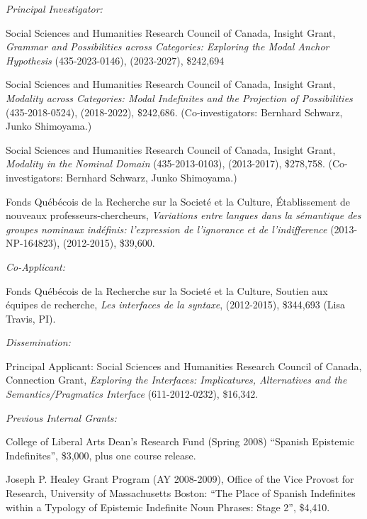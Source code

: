 \documentclass[11pt]{article}
\begin{document}
\textit{Principal Investigator:}

 Social Sciences and Humanities Research
Council of Canada, Insight Grant, \textit{Grammar and Possibilities across Categories: Exploring
the Modal Anchor Hypothesis} (435-2023-0146), (2023-2027), \$242,694

 Social Sciences and Humanities Research
Council of Canada, Insight Grant, \textit{Modality across Categories: Modal Indefinites and the Projection of Possibilities} (435-2018-0524), (2018-2022), \$242,686. (Co-investigators:
Bernhard Schwarz, Junko Shimoyama.)

 Social Sciences and Humanities Research
Council of Canada, Insight Grant, \textit{Modality in the Nominal
  Domain} (435-2013-0103), (2013-2017), \$278,758. (Co-investigators:
Bernhard Schwarz, Junko Shimoyama.)

Fonds Qu\'eb\'ecois de la Recherche sur la
Societ\'e et la Culture, \'Etablissement de
nouveaux professeurs-chercheurs, \textit{Variations
  entre langues dans la s\'emantique des groupes nominaux ind\'efinis:
  l'expression de l'ignorance et de l'indifference} (2013-NP-164823),
(2012-2015), \$39,600.

\newpage

\textit{Co-Applicant:} 

Fonds Qu\'eb\'ecois de la Recherche sur la
Societ\'e et la Culture, Soutien aux \'equipes de recherche,
\textit{Les interfaces de la syntaxe}, (2012-2015), \$344,693 (Lisa
Travis, PI).

\textit{Dissemination:}

Principal Applicant: Social Sciences and Humanities Research Council
of Canada, Connection Grant, \textit{Exploring the Interfaces:
  Implicatures, Alternatives and the Semantics/Pragmatics Interface}
(611-2012-0232), \$16,342. %



\textit{Previous Internal Grants:}

College of Liberal Arts Dean's Research Fund (Spring 2008) ``Spanish Epistemic Indefinites'', \$3,000, plus one course release.

Joseph P. Healey Grant Program (AY 2008-2009), Office of the
  Vice Provost for Research, University of Massachusetts Boston: ``The
  Place of Spanish Indefinites within a Typology of Epistemic
  Indefinite Noun Phrases: Stage 2'', \$4,410.
\end{document}
